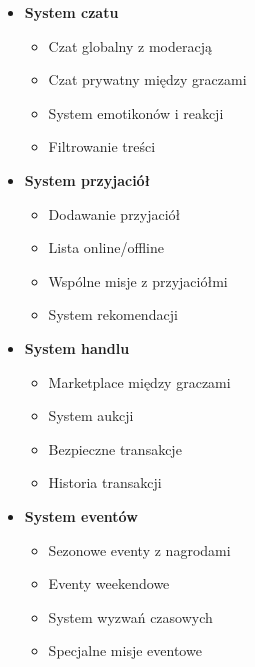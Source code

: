 \begin{itemize}
    \item \textbf{System czatu}
    \begin{itemize}
        \item Czat globalny z moderacją
        \item Czat prywatny między graczami
        \item System emotikonów i reakcji
        \item Filtrowanie treści
    \end{itemize}

    \item \textbf{System przyjaciół}
    \begin{itemize}
        \item Dodawanie przyjaciół
        \item Lista online/offline
        \item Wspólne misje z przyjaciółmi
        \item System rekomendacji
    \end{itemize}

    \item \textbf{System handlu}
    \begin{itemize}
        \item Marketplace między graczami
        \item System aukcji
        \item Bezpieczne transakcje
        \item Historia transakcji
    \end{itemize}

    \item \textbf{System eventów}
    \begin{itemize}
        \item Sezonowe eventy z nagrodami
        \item Eventy weekendowe
        \item System wyzwań czasowych
        \item Specjalne misje eventowe
    \end{itemize}
\end{itemize}